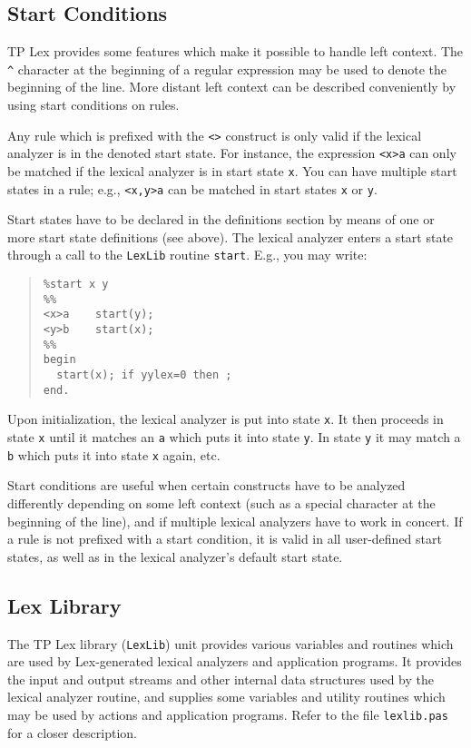 \subsection{Start Conditions}

TP Lex provides some features which make it possible to handle left context.
The \verb"^" character at the beginning of a regular expression may be used
to denote the beginning of the line. More distant left context can be described
conveniently by using start conditions on rules.

Any rule which is prefixed with the \verb"<>" construct is only valid if the
lexical analyzer is in the denoted start state. For instance, the expression
\verb"<x>a" can only be matched if the lexical analyzer is in start state
\verb"x". You can have multiple start states in a rule; e.g., \verb"<x,y>a"
can be matched in start states \verb"x" or \verb"y".

Start states have to be declared in the definitions section by means of
one or more start state definitions (see above). The lexical analyzer enters
a start state through a call to the \verb"LexLib" routine \verb"start". E.g.,
you may write:

\begin{quote}\begin{verbatim}
%start x y
%%
<x>a    start(y);
<y>b    start(x);
%%
begin
  start(x); if yylex=0 then ;
end.
\end{verbatim}\end{quote}

Upon initialization, the lexical analyzer is put into state \verb"x". It then
proceeds in state \verb"x" until it matches an \verb"a" which puts it into
state \verb"y". In state \verb"y" it may match a \verb"b" which puts it into
state \verb"x" again, etc.

Start conditions are useful when certain constructs have to be analyzed
differently depending on some left context (such as a special character
at the beginning of the line), and if multiple lexical analyzers have to
work in concert. If a rule is not prefixed with a start condition, it is
valid in all user-defined start states, as well as in the lexical analyzer's
default start state.

\subsection{Lex Library}

The TP Lex library (\verb"LexLib") unit provides various variables and
routines which are used by Lex-generated lexical analyzers and application
programs. It provides the input and output streams and other internal data
structures used by the lexical analyzer routine, and supplies some variables
and utility routines which may be used by actions and application programs.
Refer to the file \verb"lexlib.pas" for a closer description.

